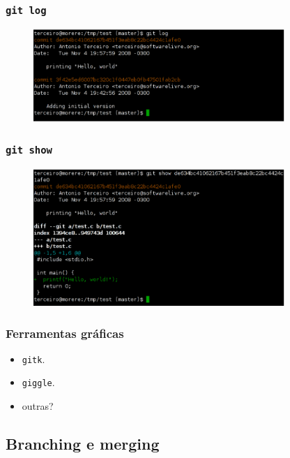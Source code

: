 \documentclass{beamer}
\begin{document}
\begin{frame}
  \frametitle{\texttt{git log}}
  \begin{figure}[h]
    \begin{center}
      \includegraphics[width=0.85\textwidth]{figs/git-screenshot-log.pdf}
    \end{center}
    \label{fig:git-log}
  \end{figure}
\end{frame}

\begin{frame}
  \frametitle{\texttt{git show}}
  \begin{figure}[h]
    \begin{center}
      \includegraphics[width=0.85\textwidth]{figs/git-screenshot-show.pdf}
    \end{center}
    \label{fig:git-show}
  \end{figure}
\end{frame}

\begin{frame}
  \frametitle{Ferramentas gráficas}
  \begin{itemize}
    \item \texttt{gitk}.
    \item \texttt{giggle}.
    \item outras?
  \end{itemize}
\end{frame}

\subsection{Branching e merging}
\end{document}
